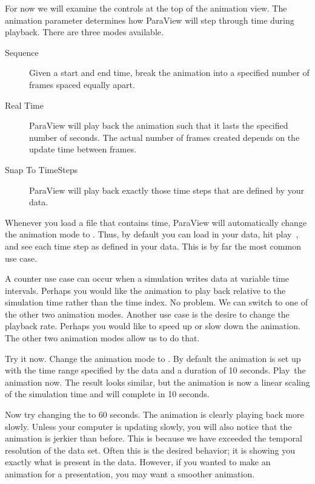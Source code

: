 For now we will examine the controls at the top of the animation view.  The
animation  parameter determines how ParaView will step
through time during playback.  There are three modes available.

\begin{description}
\item[Sequence] Given a start and end time, break the animation into a
  specified number of frames spaced equally apart.
\item[Real Time] ParaView will play back the animation such that it lasts
  the specified number of seconds.  The actual number of frames created
  depends on the update time between frames.
\item[Snap To TimeSteps] ParaView will play back exactly those time steps
  that are defined by your data.
\end{description}

Whenever you load a file that contains time, ParaView will automatically
change the animation mode to .  Thus, by default you
can load in your data, hit play~\vcrPlay, and see each time step as defined
in your data.  This is by far the most common use case.

A counter use case can occur when a simulation writes data at variable time
intervals.  Perhaps you would like the animation to play back relative to
the simulation time rather than the time index.  No problem.  We can switch
to one of the other two animation modes.  Another use case is the desire to
change the playback rate.  Perhaps you would like to speed up or slow down
the animation.  The other two animation modes allow us to do that.

Try it now.  Change the animation mode to .  By default the
animation is set up with the time range specified by the data and a
duration of 10 seconds.  Play~\vcrPlay the animation now.  The result looks
similar, but the animation is now a linear scaling of the simulation time
and will complete in 10 seconds.

Now try changing the  to 60 seconds.  The animation is
clearly playing back more slowly.  Unless your computer is updating slowly,
you will also notice that the animation is jerkier than before.  This is
because we have exceeded the temporal resolution of the data set.  Often
this is the desired behavior; it is showing you exactly what is present in
the data.  However, if you wanted to make an animation for a presentation,
you may want a smoother animation.


